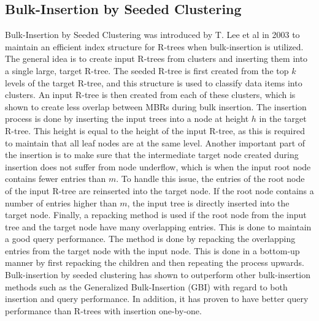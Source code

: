\subsection{Bulk-Insertion by Seeded Clustering}

Bulk-Insertion by Seeded Clustering was introduced by T. Lee et al in 2003 to maintain an efficient index structure for R-trees when bulk-insertion is utilized\cite{SeededClustering}. The general idea is to create input R-trees from clusters and inserting them into a single large, target R-tree. The seeded R-tree is first created from the top $k$ levels of the target R-tree, and this structure is used to classify data items into clusters. An input R-tree is then created from each of these clusters, which is shown to create less overlap between MBRs during bulk insertion. The insertion process is done by inserting the input trees into a node at height $h$ in the target R-tree. This height is equal to the height of the input R-tree, as this is required to maintain that all leaf nodes are at the same level. Another important part of the insertion is to make sure that the intermediate target node created during insertion does not suffer from node underflow, which is when the input root node contains fewer entries than $m$. To handle this issue, the entries of the root node of the input R-tree are reinserted into the target node. If the root node contains a number of entries higher than $m$, the input tree is directly inserted into the target node. Finally, a repacking method is used if the root node from the input tree and the target node have many overlapping entries. This is done to maintain a good query performance. The method is done by repacking the overlapping entries from the target node with the input node. This is done in a bottom-up manner by first repacking the children and then repeating the process upwards. Bulk-insertion by seeded clustering has shown to outperform other bulk-insertion methods such as the Generalized Bulk-Insertion (GBI) with regard to both insertion and query performance. In addition, it has proven to have better query performance than R-trees with insertion one-by-one\cite{SeededClustering}.

